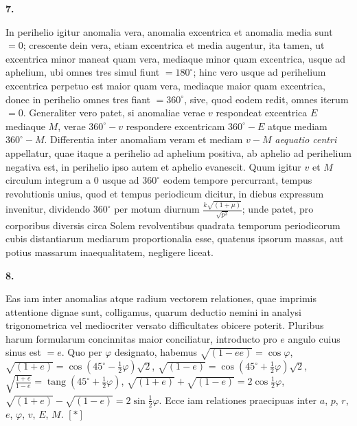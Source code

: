 \documentclass[12pt,a4paper]{book}
\newcommand{\tang}{\operatorname{tang}}
\begin{document}
\textbf{7.}

In perihelio igitur anomalia vera, anomalia excentrica et anomalia media sunt $=0$; crescente dein vera, etiam excentrica et media augentur, ita tamen, ut excentrica minor maneat quam vera, mediaque minor quam excentrica, usque ad aphelium, ubi omnes tres simul fiunt $=180^{\circ}$; hinc vero usque ad perihelium excentrica perpetuo est maior quam vera, mediaque maior quam excentrica, donec in perihelio omnes tres fiant $=360^{\circ}$, sive, quod eodem redit, omnes iterum $=0$. Generaliter vero patet, si anomaliae verae $v$ respondeat excentrica $E$ mediaque $M$, verae $360^{\circ}-v$ respondere excentricam $360^{\circ}-E$ atque mediam $360^{\circ}-M$. Differentia inter anomaliam veram et mediam $v-M$ \textit{aequatio centri} appellatur, quae itaque a perihelio ad aphelium positiva, ab aphelio ad perihelium negativa est, in perihelio ipso autem et aphelio evanescit. Quum igitur $v$ et $M$ circulum integrum a $0$ usque ad $360^{\circ}$ eodem tempore percurrant, tempus revolutionis unius, quod et tempus periodicum dicitur, in diebus expressum invenitur, dividendo $360^{\circ}$ per motum diurnum $\frac{k\sqrt{(1+\mu)}}{\sqrt{p^{3}}}$; unde patet, pro corporibus diversis circa Solem revolventibus quadrata temporum periodicorum cubis distantiarum mediarum proportionalia esse, quatenus ipsorum massas, aut potius massarum inaequalitatem, negligere liceat.

\textbf{8.}

Eas iam inter anomalias atque radium vectorem relationes, quae imprimis attentione dignae sunt, colligamus, quarum deductio nemini in analysi trigonometrica vel mediocriter versato difficultates obicere poterit. Pluribus harum formularum concinnitas maior conciliatur, introducto pro $e$ angulo cuius sinus est $=e$. Quo per $\varphi$ designato, habemus $\sqrt{(1-ee)}=\cos\varphi$, $\sqrt{(1+e)}=\cos(45^{\circ}-\tfrac{1}{2}\varphi)\sqrt{2}$, $\sqrt{(1-e)}=\cos(45^{\circ}+\tfrac{1}{2}\varphi)\sqrt{2}$, $\sqrt{\frac{1+e}{1-e}}=\tang(45^{\circ}+\tfrac{1}{2}\varphi)$, $\sqrt{(1+e)}+\sqrt{(1-e)}=2\cos\tfrac{1}{2}\varphi$, $\sqrt{(1+e)}-\sqrt{(1-e)}=2\sin\tfrac{1}{2}\varphi$. Ecce iam relationes praecipuas inter $a$, $p$, $r$, $e$, $\varphi$, $v$, $E$, $M$. $[*]$
\end{document}
